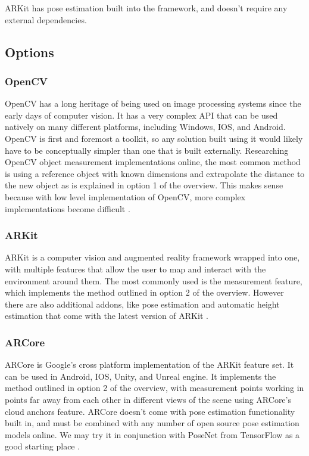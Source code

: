 \documentclass[onecolumn, draftclsnofoot,10pt, compsoc]{IEEEtran}
\begin{document}
ARKit has pose estimation built into the framework, and doesn't require any external dependencies.


\subsection{Options}
\subsubsection{OpenCV}
OpenCV has a long heritage of being used on image processing systems since the early days of computer vision. It has a very complex API that can be used natively on many different platforms, including Windows, IOS, and Android. OpenCV is first and foremost a toolkit, so any solution built using it would likely have to be conceptually simpler than one that is built externally. Researching OpenCV object measurement implementations online, the most common method is using a reference object with known dimensions and extrapolate the distance to the new object as is explained in option 1 of the overview. This makes sense because with low level implementation of OpenCV, more complex implementations become difficult \cite{openCV}. 

\subsubsection{ARKit}

ARKit is a computer vision and augmented reality framework wrapped into one, with multiple features that allow the user to map and interact with the environment around them. The most commonly used is the measurement feature, which implements the method outlined in option 2 of the overview. However there are also additional addons, like pose estimation and automatic height estimation that come with the latest version of ARKit \cite{ARKit}. 

\subsubsection{ARCore}
ARCore is Google's cross platform implementation of the ARKit feature set. It can be used in Android, IOS, Unity, and Unreal engine. It implements the method outlined in option 2 of the overview, with measurement points working in points far away from each other in different views of the scene using ARCore's cloud anchors feature. ARCore doesn't come with pose estimation functionality built in, and must be combined with any number of open source pose estimation models online. We may try it in conjunction with PoseNet from TensorFlow as a good starting place \cite{ARCore}.
\end{document}
